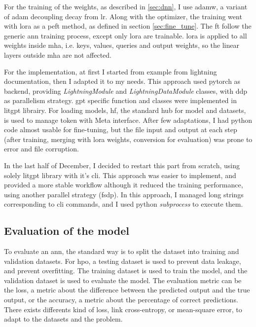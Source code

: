 For the training of the weights, as described in \ref{sec:dnn}, I use \acrshort{adamw}, a variant of \acrshort{adam} decoupling \gls{decay} \cite{krogh_simple_1991} from \gls{lr}. Along with the optimizer, the training went with \acrfull{lora} as a \acrfull{peft} method, as defined in section \ref{sec:fine_tune}. The \gls{ft} follow the generic \acrshort{ann} training process, except only \acrshort{lora} are trainable. \acrshort{lora} is applied to all weights inside \acrlong{mha}, i.e. keys, values, queries and output weights, so the linear layers outside \acrshort{mha} are not affected.

For the implementation, at first I started from example from \gls{lightning} documentation, then I adapted it to my needs. This approach used \gls{pytorch} as backend, providing \textit{LightningModule} and \textit{LightningDataModule} classes, with \acrfull{ddp} as parallelism strategy. \acrshort{gpt} specific function and classes were implemented in \gls{litgpt} librairy. For loading models, \gls{hf}, the standard hub for model and datasets, is used to manage token with Meta interface. 
After few adaptations, I had python code almost usable for fine-tuning, but the file input and output at each step (after training, merging with \acrshort{lora} weights, conversion for evaluation) was prone to error and file corruption. 

In the last half of December, I decided to restart this part from scratch, using solely \gls{litgpt} library with it's \acrfull{cli}. This approach was easier to implement, and provided a more stable workflow although it reduced the training performance, using another parallel strategy (\acrfull{fsdp}). In this approach, I managed long strings corresponding to \acrshort{cli} commands, and I used python \textit{subprocess} to execute them.


\subsection{Evaluation of the model}
\label{sec:model_evaluation}

To evaluate an \acrshort{ann}, the standard way is to split the dataset into training and validation datasets. For \acrfull{hpo}, a testing dataset is used to prevent data leakage, and prevent overfitting. The training dataset is used to train the model, and the validation dataset is used to evaluate the model. The evaluation metric can be the loss, a metric about the difference between the predicted output and the true output, or the accuracy, a metric about the percentage of correct predictions. There exists differents kind of loss, link cross-entropy, or mean-square error, to adapt to the datasets and the problem.


